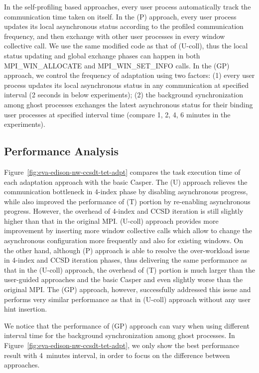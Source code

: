 In the self-profiling based approaches, every user process automatically
track the communication time taken on itself. In the \libname(P) approach,
every user process updates its local asynchronous status according to
the profiled communication frequency, and then exchange with other user
processes in every window collective call. We use the same modified
code as that of \libname(U-coll), thus the local status updating and
global exchange phases can happen in both MPI\_WIN\_ALLOCATE and
MPI\_WIN\_SET\_INFO calls. In the \libname(GP) approach, we control
the frequency of adaptation using two factors: (1) every user process
updates its local asynchronous status in any communication at specified
interval (2 seconds in below experiments); (2) the background
synchronization among ghost processes exchanges the latest asynchronous
status for their binding user processes at specified interval time
(compare 1, 2, 4, 6 minutes in the experiments).

\subsection{Performance Analysis}

Figure~\ref{fig:eva-edison-nw-ccsdt-tet-adpt} compares the task execution
time of each adaptation approach with the basic Casper. The \libname(U)
approach relieves the communication bottleneck in 4-index phase by
disabling asynchronous progress, while also improved the performance
of (T) portion by re-enabling asynchronous progress. However, the
overhead of 4-index and CCSD iteration is still slightly higher than that
in the original MPI. \libname(U-coll) approach provides more improvement
by inserting more window collective calls which allow {\libname} to
change the asynchronous configuration more frequently and also for
existing windows. On the other hand, although \libname(P) approach
is able to resolve the over-workload issue in 4-index and CCSD iteration
phases, thus delivering the same performance as that in the \libname(U-coll)
approach, the overhead of (T) portion is much larger than the user-guided
approaches and the basic Casper and even slightly worse than the original
MPI. The \libname(GP) approach, however, successfully addressed this issue
and performs very similar performance as that in \libname(U-coll) approach
without any user hint insertion.

We notice that the performance of \libname(GP) approach can vary when
using different interval time for the background synchronization among
ghost processes. In Figure~\ref{fig:eva-edison-nw-ccsdt-tet-adpt}, we only
show the best performance result with 4~minutes interval, in order to
focus on the difference between approaches.

